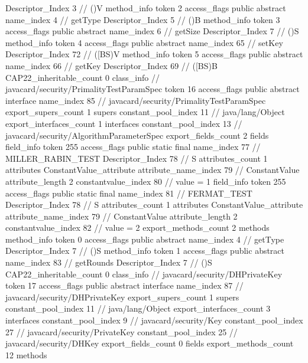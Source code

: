 {{{{{					Descriptor_Index	3		// ()V
				}
				method_info {
					token	2
					access_flags	public abstract
					name_index	4		// getType
					Descriptor_Index	5		// ()B
				}
				method_info {
					token	3
					access_flags	public abstract
					name_index	6		// getSize
					Descriptor_Index	7		// ()S
				}
				method_info {
					token	4
					access_flags	public abstract
					name_index	65		// setKey
					Descriptor_Index	72		// ([BS)V
				}
				method_info {
					token	5
					access_flags	public abstract
					name_index	66		// getKey
					Descriptor_Index	69		// ([BS)B
				}
			}
			CAP22_inheritable_count	0
		}
		class_info {		// javacard/security/PrimalityTestParamSpec
			token	16
			access_flags	public abstract interface
			name_index	85		// javacard/security/PrimalityTestParamSpec
			export_supers_count	1
			supers {
				constant_pool_index	11		// java/lang/Object
			}
			export_interfaces_count	1
			interfaces {
				constant_pool_index	13		// javacard/security/AlgorithmParameterSpec
			}
			export_fields_count	2
			fields {
			field_info {
				token	255
				access_flags	public static final
				name_index	77		// MILLER_RABIN_TEST
				Descriptor_Index	78		// S
				attributes_count	1
				attributes {
				ConstantValue_attribute {
					attribute_name_index	79		// ConstantValue
					attribute_length	2
					constantvalue_index	80		// value = 1
				}
				}
			}
			field_info {
				token	255
				access_flags	public static final
				name_index	81		// FERMAT_TEST
				Descriptor_Index	78		// S
				attributes_count	1
				attributes {
				ConstantValue_attribute {
					attribute_name_index	79		// ConstantValue
					attribute_length	2
					constantvalue_index	82		// value = 2
				}
				}
			}
			}
			export_methods_count	2
			methods {
				method_info {
					token	0
					access_flags	public abstract
					name_index	4		// getType
					Descriptor_Index	7		// ()S
				}
				method_info {
					token	1
					access_flags	public abstract
					name_index	83		// getRounds
					Descriptor_Index	7		// ()S
				}
			}
			CAP22_inheritable_count	0
		}
		class_info {		// javacard/security/DHPrivateKey
			token	17
			access_flags	public abstract interface
			name_index	87		// javacard/security/DHPrivateKey
			export_supers_count	1
			supers {
				constant_pool_index	11		// java/lang/Object
			}
			export_interfaces_count	3
			interfaces {
				constant_pool_index	9		// javacard/security/Key
				constant_pool_index	27		// javacard/security/PrivateKey
				constant_pool_index	25		// javacard/security/DHKey
			}
			export_fields_count	0
			fields {
			}
			export_methods_count	12
			methods {
}}}}
